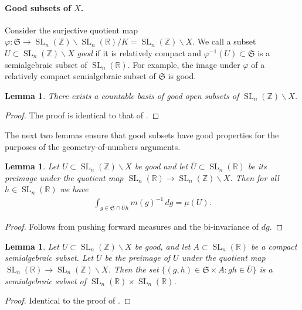 \documentclass{article} %
\newtheorem{lemma}[proposition]{Lemma}
\numberwithin{equation}{section}
\DeclareMathOperator{\SL}{SL}
\newcommand{\R}{\mathbb{R}}
\newcommand{\Z}{\mathbb{Z}}
\newcommand{\Siegel}{\mathfrak{S}}
\begin{document}
\paragraph{Good subsets of $X$.}
Consider the surjective quotient map 
$\varphi\colon \Siegel \rightarrow \SL_n(\Z)\backslash \SL_n(\R) /K = \SL_n(\Z)\backslash X$.
We call a subset $U \subset \SL_n(\Z)\backslash X$ \emph{good} if it is relatively compact and $\varphi^{-1}(U)\subset \Siegel$ is a semialgebraic subset of $\SL_n(\R)$.
For example, the image under $\varphi$ of a relatively compact semialgebraic subset of $\Siegel$ is good.


\begin{lemma}\label{lemma_countablebasis_goodsubsets}
    There exists a countable basis of good open subsets of $\SL_n(\Z)\backslash X$.
\end{lemma}
\begin{proof}
    The proof is identical to that of \cite[Lemma 3.2]{lagathorne2024smallheightoddhyperelliptic}.
\end{proof}

The next two lemmas ensure that good subsets have good properties for the purposes of the geometry-of-numbers arguments.

\begin{lemma}\label{lemma_integral_siegelset}
    Let $U\subset \SL_n(\Z)\backslash X$ be good and let $\bar{U}\subset \SL_n(\R)$ be its preimage under the quotient map $\SL_n(\R)\rightarrow \SL_n(\Z)\backslash X$. 
    Then for all $h\in \SL_n(\R)$ we have
    \begin{align*}
    \int_{g \in \Siegel \cap \bar{U}h} m(g)^{-1}\,dg = \mu(U).
    \end{align*}
\end{lemma}
\begin{proof}
    Follows from pushing forward measures and the bi-invariance of $dg$.
\end{proof}

\begin{lemma}\label{lemma_goodsubsetimpliesregionsemialg}
    Let $U\subset \SL_n(\Z)\backslash X$ be good, and let $A\subset \SL_n(\R)$ be a compact semialgebraic subset. 
    Let $\bar{U}$ be the preimage of $U$ under the quotient map $\SL_n(\R) \rightarrow \SL_n(\Z)\backslash X$.
    Then the set $\{ (g,h) \in \Siegel \times A \colon gh \in \bar{U} \}$ is a semialgebraic subset of $\SL_n(\R)\times \SL_n(\R)$.
\end{lemma}
\begin{proof}
    Identical to the proof of \cite[Lemma 3.4]{lagathorne2024smallheightoddhyperelliptic}.
\end{proof}
\end{document}
